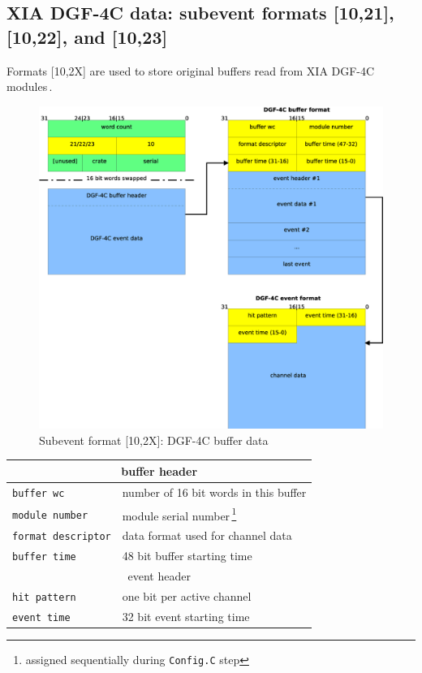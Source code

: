 \documentclass[10pt,a4paper]{article}
\begin{document}
\subsection{XIA DGF-4C data: subevent formats [10,21], [10,22], and [10,23]}
Formats [10,2X] are used to store original buffers read from XIA DGF-4C modules\,\cite{XIAManuals}.
\begin{figure}[H]
\centerline{\includegraphics[width=\linewidth]{MedSevt_DGF}}
\caption{Subevent format [10,2X]: DGF-4C buffer data}
\label{MedSevt_DGF}
\end{figure}
\begin{minipage}{\linewidth}
\begin{table}[H]
\begin{center}
\begin{tabular}{ll}
\hline
\multicolumn{2}{c}{buffer header} \\
\hline
\verb+buffer wc+ & number of 16 bit words in this buffer \\
\verb+module number+ & module serial number\,\footnote{assigned sequentially during \texttt{Config.C} step} \\
\verb+format descriptor+ & data format used for channel data \\
\verb+buffer time+ & 48 bit buffer starting time \\
\hline
\multicolumn{2}{c}{event header} \\
\hline
\verb+hit pattern+ & one bit per active channel \\
\verb+event time+ & 32 bit event starting time \\
\hline
\end{tabular}
\end{center}
\label{MedSevt_DGF_Legend}
\end{table}
\end{minipage}
\end{document}
